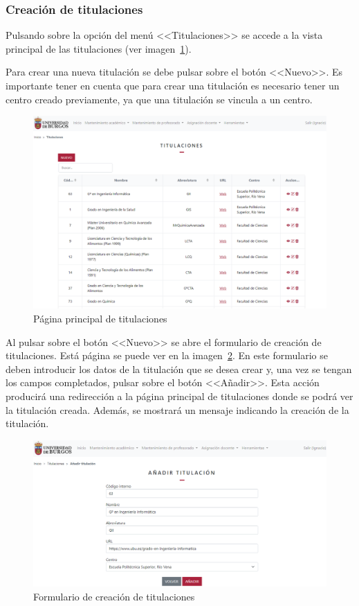 \subsubsection{Creación de titulaciones}
Pulsando sobre la opción del menú <<Titulaciones>> se accede a la vista principal de las titulaciones (ver imagen~\ref{pag:titulaciones}).

Para crear una nueva titulación se debe pulsar sobre el botón <<Nuevo>>.
Es importante tener en cuenta que para crear una titulación es necesario tener un centro creado previamente, ya que una titulación se vincula a un centro.

\begin{figure}
	\centering
	\includegraphics[width=\textwidth]{../img/Anexos/Manual usuario/titulaciones.png}
	\caption{Página principal de titulaciones}\label{pag:titulaciones}
\end{figure}

Al pulsar sobre el botón <<Nuevo>> se abre el formulario de creación de titulaciones.
Está página se puede ver en la imagen~\ref{pag:formTitulacion}.
En este formulario se deben introducir los datos de la titulación que se desea crear y, una vez se tengan los campos completados, pulsar sobre el botón <<Añadir>>.
Esta acción producirá una redirección a la página principal de titulaciones donde se podrá ver la titulación creada.
Además, se mostrará un mensaje indicando la creación de la titulación.

\begin{figure}
	\centering
	\includegraphics[width=\textwidth]{../img/Anexos/Manual usuario/formTitulacion.png}
	\caption{Formulario de creación de titulaciones}\label{pag:formTitulacion}
\end{figure}

